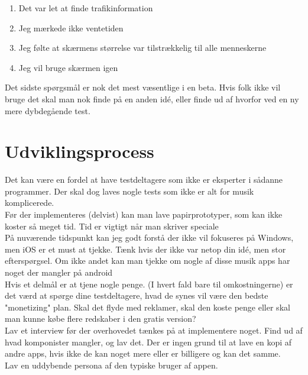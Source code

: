 \documentclass[12pt,a4paper,oneside]{article}
\begin{document}
\begin{enumerate}
\item{Det var let at finde trafikinformation}
\item{Jeg mærkede ikke ventetiden}
\item{Jeg følte at skærmens størrelse var tilstrækkelig til alle menneskerne}
\item{Jeg vil bruge skærmen igen}
\end{enumerate}

Det sidste spørgsmål er nok det mest væsentlige i en beta. Hvis folk ikke vil bruge det skal man nok finde på en anden idé, eller finde ud af hvorfor ved en ny mere dybdegående test.

\section{Udviklingsprocess}

Det kan være en fordel at have testdeltagere som ikke er eksperter i sådanne programmer. Der skal dog laves nogle tests som ikke er alt for musik komplicerede. \\

Før der implementeres (delvist) kan man lave papirprototyper, som kan ikke koster så meget tid. Tid er vigtigt når man skriver speciale\\

På nuværende tidspunkt kan jeg godt forstå der ikke vil fokuseres på Windows, men iOS er et must at tjekke. Tænk hvis der ikke var netop din idé, men stor efterspørgsel. Om ikke andet kan man tjekke om nogle af disse musik apps har noget der mangler på android\\

Hvis et delmål er at tjene nogle penge. (I hvert fald bare til omkostningerne) er det værd at spørge dine testdeltagere, hvad de synes vil være den bedste "monetizing" plan. Skal det flyde med reklamer, skal den koste penge eller skal man kunne købe flere redskaber i den gratis version? \\

Lav et interview før der overhovedet tænkes på at implementere noget. Find ud af hvad komponister mangler, og lav det. Der er ingen grund til at lave en kopi af andre apps, hvis ikke de kan noget mere eller er billigere og kan det samme.\\

Lav en uddybende persona af den typiske bruger af appen.
 
\end{document}
